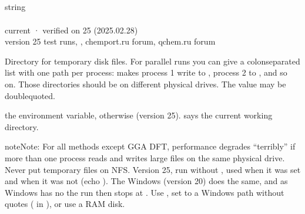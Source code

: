 \documentclass[letterpaper,10pt,english,openany,oneside]{sphinxmanual}
\begin{document}
\sphinxAtStartPar
{}

\begin{sphinxVerbatim}[commandchars=\\\{\}]
\end{sphinxVerbatim}


\subsection{}
\label{\detokenize{reference/system:path}}\label{\detokenize{reference/system:system-path}}
\ignorespaces 
\sphinxAtStartPar
{} string\\
 \\
 current · verified on 25 (2025.02.28)\\
 version 25 test runs, , chemport.ru forum, qchem.ru forum

\sphinxAtStartPar
Directory for temporary disk files. For parallel runs you can give a colon\sphinxhyphen{}separated list with one path per
process:  makes process 1 write to , process 2 to , and so on.
Those directories should be on different physical drives. The value may be double\sphinxhyphen{}quoted.

\sphinxAtStartPar
{} the  environment variable, otherwise  (version 25).  says the current working directory.

\begin{sphinxadmonition}{note}{Note:}
\sphinxAtStartPar
For all methods except GGA DFT, performance degrades “terribly” if more than one process reads and writes
large files on the same physical drive. Never put temporary files on NFS. Version 25, run without ,
used  when it was set and  when it was not (echo ). The Windows 
(version 20) does the same, and as Windows has no  the run then stops at . Use
, set  to a Windows path without quotes ( in ), or use a RAM disk.
\end{sphinxadmonition}
\end{document}
